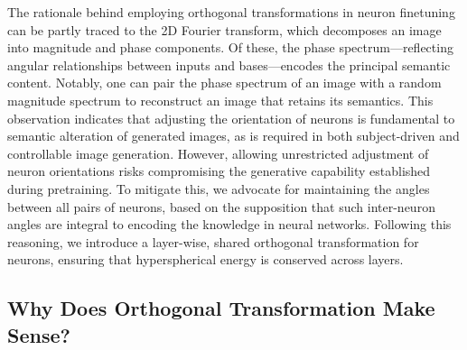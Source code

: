 The rationale behind employing orthogonal transformations in neuron finetuning can be partly traced to the 2D Fourier transform, which decomposes an image into magnitude and phase components. Of these, the phase spectrum—reflecting angular relationships between inputs and bases—encodes the principal semantic content. Notably, one can pair the phase spectrum of an image with a random magnitude spectrum to reconstruct an image that retains its semantics. This observation indicates that adjusting the orientation of neurons is fundamental to semantic alteration of generated images, as is required in both subject-driven and controllable image generation. However, allowing unrestricted adjustment of neuron orientations risks compromising the generative capability established during pretraining. To mitigate this, we advocate for maintaining the angles between all pairs of neurons, based on the supposition that such inter-neuron angles are integral to encoding the knowledge in neural networks. Following this reasoning, we introduce a layer-wise, shared orthogonal transformation for neurons, ensuring that hyperspherical energy is conserved across layers.

\subsection{Why Does Orthogonal Transformation Make Sense?}

